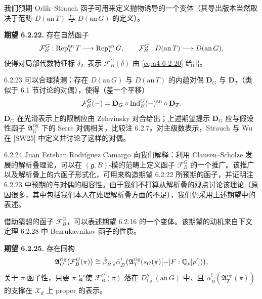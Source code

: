 我们预期 Orlik--Strauch 函子可用来定义抛物诱导的一个变体（其导出版本当然取决于范畴 $D(\mathrm{an}\,T)$ 与 $D(\mathrm{an}\,G)$ 的定义）。

\medskip\noindent\textbf{期望 6.2.22.}\label{exp:a4-6-2-22}
存在自然函子
\[
\mathcal F_B^G:\operatorname{Rep}_L^{\mathrm{an}}T\longrightarrow\operatorname{Rep}_L^{\mathrm{an}}G,\qquad
\mathcal F_B^G:D(\mathrm{an}\,T)\longrightarrow D(\mathrm{an}\,G),
\]
使得对局部代数特征标 $\delta$，表示 $\mathcal F_B^G(\delta)$ 由 \eqref{eq:a4-6-2-20} 给出。

\begin{rem}{6.2.23}\label{rem:a4-6-2-23}
可以合理猜测：存在 $D(\mathrm{an}\,G)$ 与 $D(\mathrm{an}\,T)$ 的内蕴对偶 $\mathbf D_G$ 与 $\mathbf D_T$（类似于 6.1 节讨论的对偶），使得（差一个平移）
\[
\mathcal F_B^G(-)=\mathbf D_G\circ\operatorname{Ind}_B^G(-)^{\mathrm{an}}\circ\mathbf D_T.
\]
$\mathbf D_G$ 在光滑表示上的限制应由 Zelevinsky 对合给出；上述期望提示 $\mathbf D_G$ 应与假设性函子 $\mathfrak A_G^{\mathrm{rig}}$ 下的 Serre 对偶相关，比较注 6.2.7。对主级数表示，Strauch 与 Wu 在 [SW25] 中定义并讨论了这样的对偶。
\end{rem}

\begin{rem}{6.2.24}\label{rem:a4-6-2-24}
Juan Esteban Rodríguez Camargo 向我们解释：利用 Clausen--Scholze 发展的解析叠理论，可以在 $(\mathfrak g,B)$-模的范畴上定义函子 $\mathcal F_B^G$ 的一个推广。该推广以及解析叠上的六函子形式化，可用来构造期望 6.2.22 所预期的函子，并证明注 6.2.23 中预期的与对偶的相容性。由于我们不打算从解析叠的观点讨论该理论（原因很多，其中包括我们本人在处理解析叠方面的不足），我们仍采用上述期望中的表述。
\end{rem}

借助猜想的函子 $\mathcal F_B^G$，可以表述期望 6.2.16 的一个变体。该期望的动机来自下文定理 6.2.28 中 Bezrukavnikov 函子的性质。

\medskip\noindent\textbf{期望 6.2.25.}\label{exp:a4-6-2-25}
存在同构
\[
\mathfrak A_G^{\mathrm{rig}}\bigl(\mathcal F_B^G(\pi)\bigr)\cong
\tilde\beta_{\hat B,*}\tilde\alpha_{\hat B}^{!}
\bigl(\mathfrak A_T^{\mathrm{rig}}(s_G(\pi)[-[F:\mathbb{Q}_p]\rho'])\bigr),
\]
关于 $\pi$ 函子性，只要 $\pi$ 是使 $\mathcal F_B^G(\pi)$ 落在 $D^b_{\mathrm{f.p.}}(\mathrm{an}\,G)$ 中、且 $\tilde\alpha_{\hat B}^{!}(\mathfrak A_T^{\mathrm{rig}}(\pi))$ 的支撑在 $\mathcal X_d$ 上 proper 的表示。

